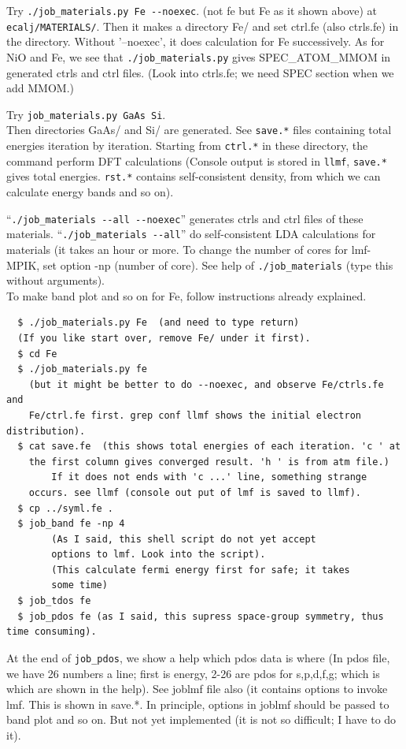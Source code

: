 \documentclass[a4paper,10pt,epsf,fleqn]{article}
\begin{document}
Try \verb+./job_materials.py Fe --noexec+. (not fe but Fe as it shown above)
at \verb+ecalj/MATERIALS/+. 
Then it makes a directory Fe/ and set ctrl.fe (also ctrls.fe) in the
directory. Without '--noexec', it does calculation for Fe successively.
As for NiO and Fe, we see that \verb+./job_materials.py+ gives
SPEC\_ATOM\_MMOM in generated ctrls and ctrl files.
(Look into ctrls.fe; we need SPEC section when we add MMOM.)

Try \verb+job_materials.py GaAs Si+.\\
Then directories GaAs/ and Si/ are generated. See \verb+save.*+ files containing
total energies iteration by iteration. Starting from \verb+ctrl.*+ in
these directory, the command perform DFT calculations 
(Console output is stored in \verb+llmf+, \verb+save.*+ gives
total energies. \verb+rst.*+ contains self-consistent
density, from which we can calculate energy bands and so on).

``\verb+./job_materials --all --noexec+'' generates ctrls and ctrl files of
these materials. ``\verb+./job_materials --all+'' do self-consistent
LDA calculations for materials (it takes an hour or more. To change the
number of cores for lmf-MPIK, set option -np (number of core). See
help of \verb+./job_materials+ (type this without arguments).\\

To make band plot and so on for Fe, follow instructions already explained.
\begin{verbatim}
  $ ./job_materials.py Fe  (and need to type return)
  (If you like start over, remove Fe/ under it first).
  $ cd Fe
  $ ./job_materials.py fe
    (but it might be better to do --noexec, and observe Fe/ctrls.fe and
	Fe/ctrl.fe first. grep conf llmf shows the initial electron distribution).
  $ cat save.fe  (this shows total energies of each iteration. 'c ' at
	the first column gives converged result. 'h ' is from atm file.)
        If it does not ends with 'c ...' line, something strange
	occurs. see llmf (console out put of lmf is saved to llmf).
  $ cp ../syml.fe .
  $ job_band fe -np 4 
        (As I said, this shell script do not yet accept
	    options to lmf. Look into the script).
        (This calculate fermi energy first for safe; it takes
	    some time)       
  $ job_tdos fe
  $ job_pdos fe (as I said, this supress space-group symmetry, thus time consuming).
\end{verbatim}
At the end of \verb+job_pdos+, we show a help which pdos data is where
(In pdos file, we have 26 numbers a line; first is energy, 2-26 are pdos
for s,p,d,f,g; which is which are shown in the help).
See joblmf file also (it contains options to invoke lmf. This is shown
in save.*. In principle, options in joblmf should be passed to band plot
and so on. But not yet implemented 
(it is not so difficult; I have to do it).
\end{document}
